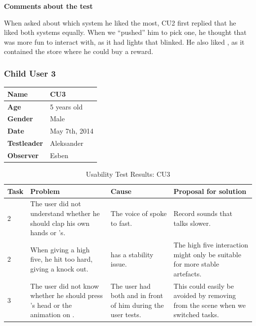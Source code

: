 \textbf{Comments about the test}

When asked about which system he liked the most, CU2 first replied that he liked both systems equally. When we ``pushed'' him to pick one, he thought that \ab{} was more fun to interact with, as it had lights that blinked. He also liked \app{}, as it contained the store where he could buy a reward. 

\subsubsection{Child User 3}
\begin{table}[H]
\centering
\begin{tabular}{| p{4.0cm} | p{4.0cm} |}
\hline
 \textbf{Name} & CU3 \\
 \hline
 \textbf{Age} & 5 years old \\
 \hline 
 \textbf{Gender} & Male \\
 \hline
 \textbf{Date} & May 7th, 2014 \\
 \hline
 \textbf{Testleader} & Aleksander \\
 \hline
 \textbf{Observer} & Esben \\
 \hline
\end{tabular}
\end{table}


\begin{table}[H]
\centering
\begin{tabular}{| p{1.0cm} | p{4.0cm} | p{4.0cm} | p{4.0cm} |}
	\hline
	\textbf{Task} & \textbf{Problem} & \textbf{Cause} & \textbf{Proposal for solution} \\
	\hline
	2 & The user did not understand whether he should clap his own hands or \ab{}'s. & The voice of \ab{} spoke to fast. & Record sounds that talks slower. \\
	\hline
	2 & When giving \ab{} a high five, he hit too hard, giving \ab{} a knock out. & \ab{} has a stability issue. & The high five interaction might only be suitable for more stable artefacts. \\
	\hline
	3 & The user did not know whether he should press \ab{}'s head or the animation on \app{}. & The user had both \ab{} and \app{} in front of him during the user tests. & This could easily be avoided by removing \ab{} from the scene when we switched tasks. \\
	\hline  
\end{tabular}
\caption{Usability Test Results: CU3}
\label{tab:testchild3}
\end{table}

